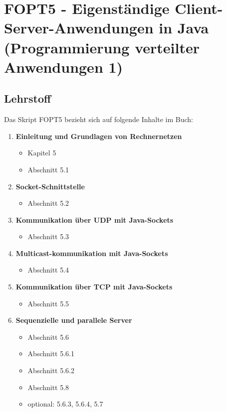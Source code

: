 \chapter{FOPT5 - Eigenständige Client-Server-Anwendungen in Java (Programmierung verteilter Anwendungen 1)}

\section{Lehrstoff}

Das Skript FOPT5 bezieht sich auf folgende Inhalte im Buch:

\begin{tcolorbox}[colback=white!20,color=white]
    \begin{enumerate}
        \setcounter{enumi}{0}
        \item \textbf{Einleitung und Grundlagen von Rechnernetzen}
        \begin{itemize}
            \item[] Kapitel 5
            \item[] Abschnitt 5.1
        \end{itemize}

        \item \textbf{Socket-Schnittstelle}
        \begin{itemize}
            \item[] Abschnitt 5.2
        \end{itemize}

        \item \textbf{Kommunikation über UDP mit Java-Sockets}
        \begin{itemize}
            \item[] Abschnitt 5.3
        \end{itemize}

        \item \textbf{Multicast-kommunikation mit Java-Sockets}
        \begin{itemize}
            \item[] Abschnitt 5.4
        \end{itemize}

        \item \textbf{Kommunikation über TCP mit Java-Sockets}
        \begin{itemize}
            \item[] Abschnitt 5.5
        \end{itemize}

        \item \textbf{Sequenzielle und parallele Server}
        \begin{itemize}
            \item[] Abschnitt 5.6
            \item[] Abschnitt 5.6.1
            \item[] Abschnitt 5.6.2
            \item[] Abschnitt 5.8
            \item[] optional: 5.6.3, 5.6.4, 5.7
        \end{itemize}


\end{enumerate}
\end{tcolorbox}
